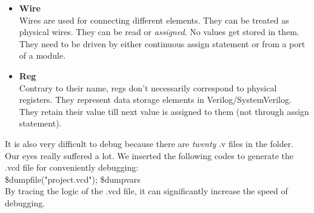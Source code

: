 \documentclass{article}
\begin{document}
    \begin{itemize}
        \item \textbf{Wire} \\
        Wires are used for connecting different elements. 
        They can be treated as physical wires. 
        They can be read or \textit{assigned}. 
        No values get stored in them. They need to be driven by either continuous assign statement or from a port of a module. 
        \item \textbf{Reg} \\
        Contrary to their name, regs don't necessarily correspond to 
         physical registers. They represent data storage elements in
         Verilog/SystemVerilog. They retain their value till next value is
         assigned to them (not through assign statement). 
    \end{itemize}
    
    It is also very difficult to debug because there are \textit{twenty} .v files in the folder. 
    Our eyes really suffered a lot. 
    We inserted the following codes to generate the .vcd file for conveniently debugging: \\

    \hspace{10mm}\$dumpfile("project.vcd"); \vskip0mm
    \hspace{10mm}\$dumpvars \\

    By tracing the logic of the .vcd file, it can significantly increase the speed of debugging.
\end{document}
